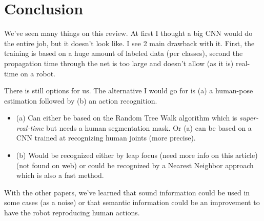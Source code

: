 \documentclass[a4paper]{article}
\begin{document}
		\section{Conclusion}
			We've seen many things on this review. At first I thought a big CNN would do the entire job, but it doesn't look like. I see 2 main drawback with it. First, the training is based on a huge amount of labeled data (per classes), second the propagation time through the net is too large and doesn't allow (as it is) real-time on a robot.

			There is still options for us. The alternative I would go for is (a) a human-pose estimation followed by (b) an action recognition. 
			\begin{itemize}
				\item (a) Can either be based on the Random Tree Walk\cite{yub2015random} algorithm which is \textit{super-real-time} but needs a human segmentation mask. Or (a) can be based on a CNN trained at recognizing human joints \cite{tompson2014real} (more precise).
				\item (b) Would be recognized either by leap focus \cite{kwon2014complexity} (need more info on this article) (not found on web) or could be recognized by a Nearest Neighbor approach\cite{zanfir2013moving} which is also a fast method.
			\end{itemize}

			With the other papers, we've learned that sound information could be used in some cases (as a noise) or that semantic information could be an improvement to have the robot reproducing human actions.




 
\end{document}
